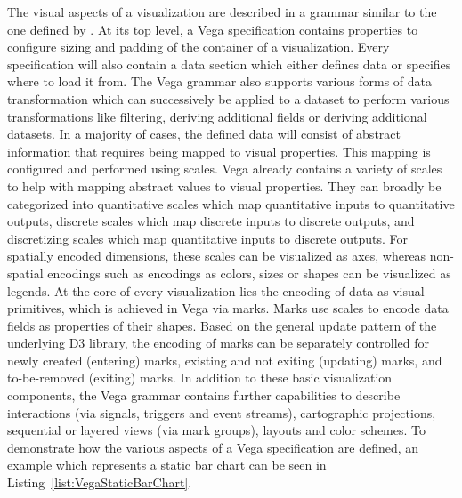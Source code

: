 The visual aspects of a visualization are described in a grammar
similar to the one defined by \textcite{GrammarOfGraphics}.  At its
top level, a Vega specification contains properties to configure
sizing and padding of the container of a visualization.  Every
specification will also contain a data section which either defines
data or specifies where to load it from.  The Vega grammar also
supports various forms of data transformation which can successively
be applied to a dataset to perform various transformations like
filtering, deriving additional fields or deriving additional datasets.
In a majority of cases, the defined data will consist of abstract
information that requires being mapped to visual properties.  This
mapping is configured and performed using scales.  Vega already
contains a variety of scales to help with mapping abstract values to
visual properties.  They can broadly be categorized into quantitative
scales which map quantitative inputs to quantitative outputs, discrete
scales which map discrete inputs to discrete outputs, and discretizing
scales which map quantitative inputs to discrete outputs.  For
spatially encoded dimensions, these scales can be visualized as axes,
whereas non-spatial encodings such as encodings as colors, sizes or
shapes can be visualized as legends.  At the core of every
visualization lies the encoding of data as visual primitives, which is
achieved in Vega via marks.  Marks use scales to encode data fields as
properties of their shapes.  Based on the general update pattern of
the underlying D3 library, the encoding of marks can be separately
controlled for newly created (entering) marks, existing and not
exiting (updating) marks, and to-be-removed (exiting) marks.  In
addition to these basic visualization components, the Vega grammar
contains further capabilities to describe interactions (via signals,
triggers and event streams), cartographic projections, sequential or
layered views (via mark groups), layouts and color schemes.  To
demonstrate how the various aspects of a Vega specification are
defined, an example which represents a static bar chart can be seen in
Listing~\ref{list:VegaStaticBarChart}.


\begin{samepage}
 
    The Vega specification of a static bar chart.
    Demonstrates the principle of data, scales, axes and marks.
  },
]{listings/vega-static-bar-chart.json}
\end{samepage}


